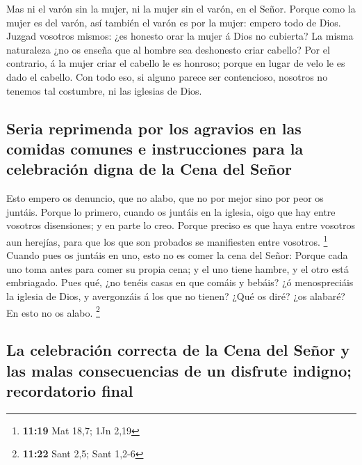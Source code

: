 Mas ni el varón sin la mujer, ni la mujer sin el varón,
en el Señor.  Porque como la mujer es del varón, así
también el varón es por la mujer: empero todo de Dios. 
Juzgad vosotros mismos: ¿es honesto orar la mujer á Dios no cubierta?
 La misma naturaleza ¿no os enseña que al hombre sea
deshonesto criar cabello?  Por el contrario, á la mujer
criar el cabello le es honroso; porque en lugar de velo le es dado el
cabello.  Con todo eso, si alguno parece ser contencioso,
nosotros no tenemos tal costumbre, ni las iglesias de Dios.

\hypertarget{seria-reprimenda-por-los-agravios-en-las-comidas-comunes-e-instrucciones-para-la-celebraciuxf3n-digna-de-la-cena-del-seuxf1or}{%
\subsection{Seria reprimenda por los agravios en las comidas comunes e
instrucciones para la celebración digna de la Cena del
Señor}\label{seria-reprimenda-por-los-agravios-en-las-comidas-comunes-e-instrucciones-para-la-celebraciuxf3n-digna-de-la-cena-del-seuxf1or}}

 Esto empero os denuncio, que no alabo, que no por mejor
sino por peor os juntáis.  Porque lo primero, cuando os
juntáis en la iglesia, oigo que hay entre vosotros disensiones; y en
parte lo creo.  Porque preciso es que haya entre vosotros
aun herejías, para que los que son probados se manifiesten entre
vosotros. \footnote{\textbf{11:19} Mat 18,7; 1Jn 2,19} 
Cuando pues os juntáis en uno, esto no es comer la cena del Señor:
 Porque cada uno toma antes para comer su propia cena; y
el uno tiene hambre, y el otro está embriagado.  Pues
qué, ¿no tenéis casas en que comáis y bebáis? ¿ó menospreciáis la
iglesia de Dios, y avergonzáis á los que no tienen? ¿Qué os diré? ¿os
alabaré? En esto no os alabo. \footnote{\textbf{11:22} Sant 2,5; Sant
  1,2-6}

\hypertarget{la-celebraciuxf3n-correcta-de-la-cena-del-seuxf1or-y-las-malas-consecuencias-de-un-disfrute-indigno-recordatorio-final}{%
\subsection{La celebración correcta de la Cena del Señor y las malas
consecuencias de un disfrute indigno; recordatorio
final}\label{la-celebraciuxf3n-correcta-de-la-cena-del-seuxf1or-y-las-malas-consecuencias-de-un-disfrute-indigno-recordatorio-final}}

